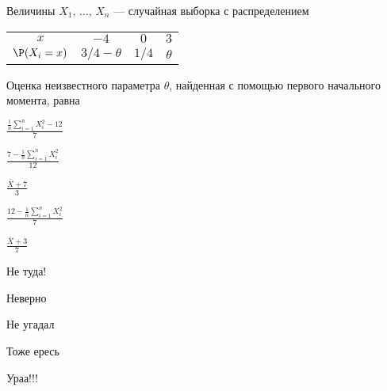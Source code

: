 
\begin{question}
Величины \(X_1, \, \ldots, \, X_n\) --- случайная выборка с
распределением

\begin{tabular}{cccc}
\toprule
  $x$                     & $-4$                 & $0$    & $3$         \\
  $\P(X_i=x)$        & $3/4 - \theta$       & $1/4$  & $\theta$    \\
\bottomrule
\end{tabular}

Оценка неизвестного параметра \(\theta\), найденная с помощью первого
начального момента, равна
\begin{answerlist}
  \item \(\frac{\frac{1}{n} \sum_{i=1}^{n}X_i^2 - 12}{7}\)
  \item \(\frac{7 - \frac{1}{n} \sum_{i=1}^{n}X_i^2}{12}\)
  \item \(\frac{\bar X + 7}{3}\)
  \item \(\frac{12 - \frac{1}{n} \sum_{i=1}^{n}X_i^2}{7}\)
  \item \(\frac{\bar X + 3}{7}\)
\end{answerlist}
\end{question}

\begin{solution}
\begin{answerlist}
  \item Не туда!
  \item Неверно
  \item Не угадал
  \item Тоже ересь
  \item Ураа!!!
\end{answerlist}
\end{solution}

